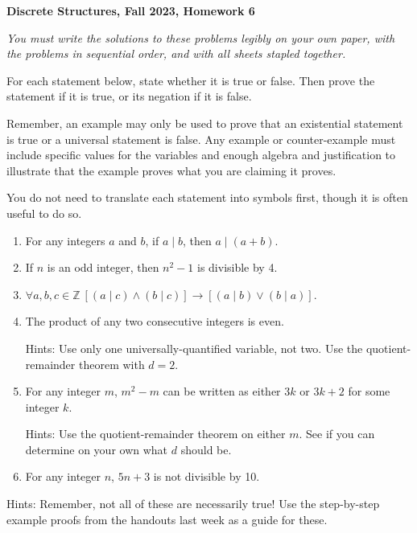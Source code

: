 \documentclass[12pt, letterpaper]{report}
\newcommand{\Z}{\mathbb{Z}}
\begin{document}
{\textbf{Discrete Structures, Fall 2023, Homework 6}}

\medbreak

\textit{You must write the solutions to these problems legibly on your own paper, with
the problems in sequential order, and with all sheets stapled together.}

\bigskip

For each statement below, state whether it is true or false. Then prove the statement if it is true,
or its negation if it is false.\medskip

Remember, an example may only be used to prove that an existential statement is true or a universal
statement is false. Any example or counter-example must include specific values for the variables
and enough algebra and justification to illustrate that the example proves what you are claiming
it proves.\medskip

You do not need to translate each statement into symbols first, though it is often useful to do so.

\begin{enumerate}

        \item For any integers $a$ and $b$, if $a \mid b$, then $a \mid (a+b)$.  %
        
        \item If $n$ is an odd integer, then $n^2-1$ is divisible by 4.  %
        
        \item $\forall a, b, c \in \Z \ [(a \mid c) \land (b \mid c)] \to [(a \mid b) \lor (b \mid a)]$.  %
        
        \item The product of any two consecutive integers is even.  
        
        Hints:  Use only one universally-quantified variable, not two.  Use the quotient-remainder theorem with $d=2$.
        
        
        
        \item For any integer $m$, $m^2-m$ can be written as either $3k$ or $3k+2$ for some integer $k$.
        
        Hints:  Use the quotient-remainder theorem on either $m$.  See if you can determine on your own what $d$ should be.          

	\item For any integer $n$, $5n+3$ is not divisible by 10.

\end{enumerate}
Hints: Remember, not all of these are necessarily true!  Use the step-by-step example proofs from the handouts last week
as a guide for these.
 
\end{document}
